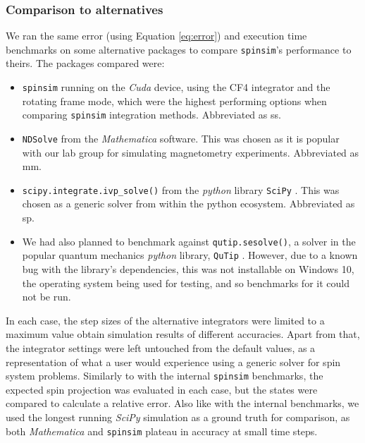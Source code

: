 \documentclass{jors}
\begin{document}

		\subsubsection*{Comparison to alternatives}
			We ran the same error (using Equation \eqref{eq:error}) and execution time benchmarks on some alternative packages to compare \texttt{spinsim}'s performance to theirs. The packages compared were:
			\begin{itemize}
				\item \texttt{spinsim} running on the \emph{Cuda} device, using the CF4 integrator and the rotating frame mode, which were the highest performing options when comparing \texttt{spinsim} integration methods. Abbreviated as ss.
				\item \texttt{NDSolve} from the \emph{Mathematica} \cite{wolfram_research_inc_mathematica_2020} software. This was chosen as it is popular with our lab group for simulating magnetometry experiments. Abbreviated as mm.
				\item \texttt{scipy.integrate.ivp\_solve()} from the \emph{python} library \texttt{SciPy} \cite{virtanen_scipy_2020}. This was chosen as a generic solver from within the python ecosystem. Abbreviated as sp.
				\item We had also planned to benchmark against \texttt{qutip.sesolve()}, a solver in the popular quantum mechanics \emph{python} library, \texttt{QuTip} \cite{johansson_qutip_2013}. However, due to a known bug with the library’s dependencies, this was not installable on Windows 10, the operating system being used for testing, and so benchmarks for it could not be run.
			\end{itemize}

			In each case, the step sizes of the alternative integrators were limited to a maximum value obtain simulation results of different accuracies. Apart from that, the integrator settings were left untouched from the default values, as a representation of what a user would experience using a generic solver for spin system problems. Similarly to with the internal \texttt{spinsim} benchmarks, the expected spin projection was evaluated in each case, but the states were compared to calculate a relative error. Also like with the internal benchmarks, we used the longest running \emph{SciPy} simulation as a ground truth for comparison, as both \emph{Mathematica} and \texttt{spinsim} plateau in accuracy at small time steps.
\end{document}
